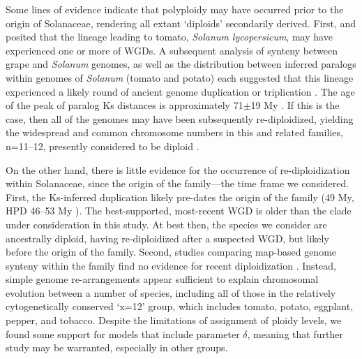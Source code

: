 Some lines of evidence indicate that polyploidy may have occurred prior to the origin of Solanaceae, rendering all extant `diploids' secondarily derived. %
First, \citet{ku2000} and \citet{blanc2004} posited that the lineage leading to tomato, \textit{Solanum lycopersicum}, may have experienced one or more of WGDs.
A subsequent analysis of synteny between grape and \textit{Solanum} genomes, as well as the distribution between inferred paralogs within genomes of \textit{Solanum} (tomato and potato) each suggested that this lineage experienced a likely round of ancient genome duplication or triplication \citep{tomato2012}. 
The age of the peak of paralog Ks distances is approximately 71$\pm$19 My \citep{tomato2012}. 
If this is the case, then all of the genomes may have been subsequently re-diploidized, yielding the widespread and common chromosome numbers in this and related families, n=11--12, presently considered to be diploid \citep{robertson_2011}. 

On the other hand, there is little evidence for the occurrence of re-diploidization within Solanaceae, since the origin of the family---the time frame we considered.
First, the Ks-inferred duplication likely pre-dates the origin of the family (49 My, HPD 46--53 My \citealt{sarkinen_2013}). 
The best-supported, most-recent WGD \citep{tomato2012} is older than the clade under consideration in this study.
At best then, the species we consider are ancestrally diploid, having re-diploidized after a suspected WGD, but likely before the origin of the family.
Second, studies comparing map-based genome synteny within the family find no evidence for recent diploidization \citep{wu_2010a}.
Instead, simple genome re-arrangements appear sufficient to explain chromosomal evolution between a number of species, including all of those in the relatively cytogenetically conserved `x=12' group, which includes tomato, potato, eggplant, pepper, and tobacco.
Despite the limitations of assignment of ploidy levels, we found some support for models that include parameter $\delta$, meaning that further study may be warranted, especially in other groups.


